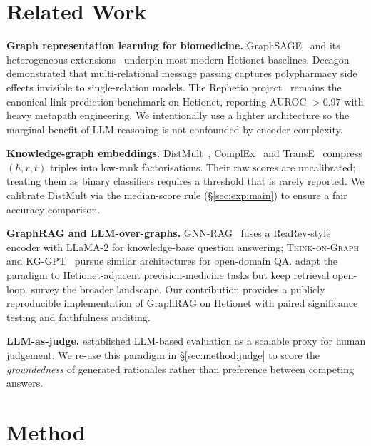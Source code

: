 \documentclass{article}
\begin{document}
\section{Related Work}
\label{sec:related}

\textbf{Graph representation learning for biomedicine.}
GraphSAGE~\citep{hamilton2017graphsage} and its heterogeneous extensions~\citep{hu2020hgt,fey2019pyg} underpin most modern Hetionet baselines. Decagon~\citep{zitnik2018decagon} demonstrated that multi-relational message passing captures polypharmacy side effects invisible to single-relation models. The Rephetio project~\citep{himmelstein2017} remains the canonical link-prediction benchmark on Hetionet, reporting AUROC $>0.97$ with heavy metapath engineering. We intentionally use a lighter architecture so the marginal benefit of LLM reasoning is not confounded by encoder complexity.

\textbf{Knowledge-graph embeddings.}
DistMult~\citep{yang2015distmult}, ComplEx~\citep{trouillon2016complex} and TransE~\citep{bordes2013transe} compress $(h,r,t)$ triples into low-rank factorisations. Their raw scores are uncalibrated; treating them as binary classifiers requires a threshold that is rarely reported. We calibrate DistMult via the median-score rule (\S\ref{sec:exp:main}) to ensure a fair accuracy comparison.

\textbf{GraphRAG and LLM-over-graphs.}
GNN-RAG~\citep{mavromatis2024gnnrag} fuses a ReaRev-style encoder with LLaMA-2 for knowledge-base question answering; \textsc{Think-on-Graph}~\citep{sun2024tog} and KG-GPT~\citep{kim2023kggpt} pursue similar architectures for open-domain QA. \citet{hays2026raggnn} adapt the paradigm to Hetionet-adjacent precision-medicine tasks but keep retrieval open-loop. \citet{gao2024ragsurvey} survey the broader landscape. Our contribution provides a publicly reproducible implementation of GraphRAG on Hetionet with paired significance testing and faithfulness auditing.

\textbf{LLM-as-judge.}
\citet{zheng2023judge} established LLM-based evaluation as a scalable proxy for human judgement. We re-use this paradigm in \S\ref{sec:method:judge} to score the \emph{groundedness} of generated rationales rather than preference between competing answers.

\section{Method}
\label{sec:method}
\end{document}
